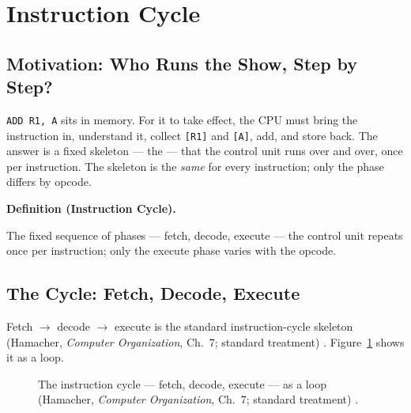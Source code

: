 \documentclass[11pt]{article}
\newenvironment{definitionbox}[1]{%
  \par\noindent\textbf{Definition (#1).}\ \itshape
}{\par\vspace{0.3em}}
\begin{document}
\section{Instruction Cycle}
\label{sec:instruction-cycle}

\subsection{Motivation: Who Runs the Show, Step by Step?}

\texttt{ADD R1, A} sits in memory. For it to take effect, the CPU must bring the instruction in, understand it, collect \texttt{[R1]} and \texttt{[A]}, add, and store back. The answer is a fixed skeleton --- the  --- that the control unit runs over and over, once per instruction. The skeleton is the \emph{same} for every instruction; only the  phase differs by opcode.

\begin{definitionbox}{Instruction Cycle}
The fixed sequence of phases --- fetch, decode, execute --- the control unit repeats once per instruction; only the execute phase varies with the opcode.
\end{definitionbox}

\subsection{The Cycle: Fetch, Decode, Execute}

Fetch $\to$ decode $\to$ execute is the standard instruction-cycle skeleton (Hamacher, \textit{Computer Organization}, Ch.~7; standard treatment) \cite{Hamacher2002_computer_organization}. Figure~\ref{fig:instruction-cycle} shows it as a loop.

\begin{figure}[h]
  \centering
  \caption{The instruction cycle --- fetch, decode, execute --- as a loop (Hamacher, \textit{Computer Organization}, Ch.~7; standard treatment) \cite{Hamacher2002_computer_organization}.}
  \label{fig:instruction-cycle}
\end{figure}
\end{document}

